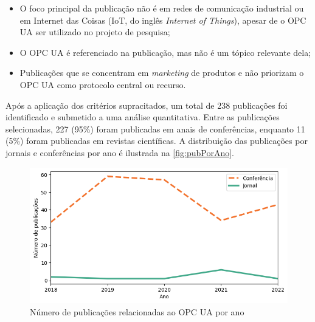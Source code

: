     \begin{itemize}
        \item O foco principal da publicação não é em redes de comunicação industrial ou em Internet das Coisas (IoT, do inglês \textit{Internet of Things}), apesar de o OPC UA ser utilizado no projeto de pesquisa;
        \item O OPC UA é referenciado na publicação, mas não é um tópico relevante dela;
        \item Publicações que se concentram em \textit{marketing} de produtos e não priorizam o OPC UA como protocolo central ou recurso.
    \end{itemize}

    Após a aplicação dos critérios supracitados, um total de 238 publicações foi identificado e submetido a uma análise quantitativa. Entre as publicações selecionadas, 227 (95\%) foram publicadas em anais de conferências, enquanto 11 (5\%) foram publicadas em revistas científicas. A distribuição das publicações por jornais e conferências por ano é ilustrada na \autoref{fig:pubPorAno}.

    

    \begin{figure}[htbp]
        \caption{Número de publicações relacionadas ao OPC UA por ano}
        \label{fig:pubPorAno}
        \begin{center}
            \includegraphics[width=0.7\linewidth]{USPSC-img/pubPerYear.png}
        \end{center}
    \end{figure}


